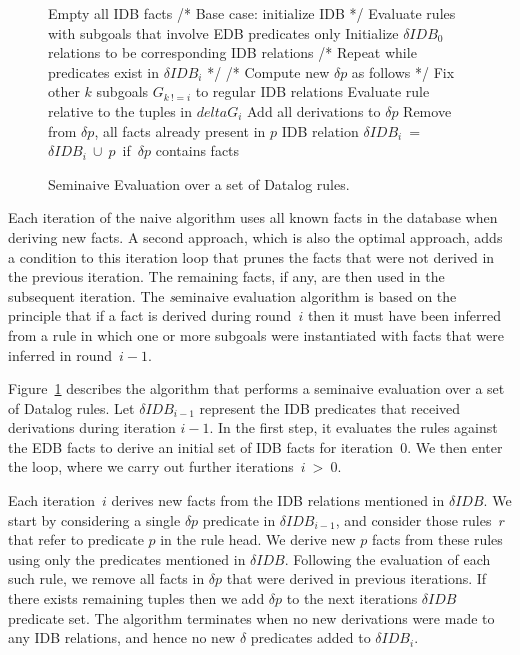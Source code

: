 \begin{figure}
\ssp
\begin{boxedminipage}{\linewidth}
    \begin{algorithmic}[1]
      	\STATE Empty all IDB facts
	\STATE /* Base case: initialize IDB */
        \STATE Evaluate rules with subgoals that involve EDB predicates only
	\STATE Initialize $\delta IDB_0$ relations to be corresponding IDB relations
	\STATE /* Repeat while predicates exist in $\delta IDB_i$ */
                	\STATE /* Compute new $\delta p$ as follows */
				\STATE Fix other $k$ subgoals $G_{k\ != i}$ to regular IDB relations
				\STATE Evaluate rule relative to the tuples in $delta G_i$ 
				\STATE Add all derivations to $\delta p$
			\ENDFOR
        	\ENDFOR
		\STATE Remove from $\delta p$, all facts already present in $p$ IDB relation
		\STATE $\delta IDB_i$\ =\ $\delta IDB_i\ \cup\ p$\ if\ $\delta p$ contains facts
        \ENDFOR
	\ENDWHILE
    \end{algorithmic}
\end{boxedminipage}
\caption{\label{ch:p2:fig:seminaive}Seminaive Evaluation over a set of Datalog rules.}
\end{figure}

Each iteration of the naive algorithm uses all known facts in the database when
deriving new facts.  A second approach, which is also the optimal approach,
adds a condition to this iteration loop that prunes the facts that were not
derived in the previous iteration.  The remaining facts, if any, are then used
in the subsequent iteration.  The {\emph seminaive evaluation} algorithm is
based on the principle that if a fact is derived during round~$i$ then it must
have been inferred from a rule in which one or more subgoals were instantiated
with facts that were inferred in round~$i-1$.

Figure~\ref{ch:p2:fig:seminaive} describes the algorithm that performs a
seminaive evaluation over a set of Datalog rules.  Let $\delta IDB_{i-1}$
represent the IDB predicates that received derivations during iteration $i-1$.
In the first step, it evaluates the rules against the EDB facts to derive an
initial set of IDB facts for iteration~$0$.  We then enter the loop, where we
carry out further iterations~$i\ >\ 0$.

Each iteration~$i$ derives new facts from the IDB relations mentioned in
$\delta IDB$.  We start by considering a single $\delta p$ predicate in $\delta
IDB_{i-1}$, and consider those rules~$r$ that refer to predicate $p$ in the
rule head.  We derive new $p$ facts from these rules using only the predicates
mentioned in $\delta IDB$.  Following the evaluation of each such rule, we
remove all facts in $\delta p$ that were derived in previous iterations.  If
there exists remaining tuples then we add $\delta p$ to the next iterations
$\delta IDB$ predicate set.  The algorithm terminates when no new derivations
were made to any IDB relations, and hence no new $\delta$ predicates added to
$\delta IDB_i$.


